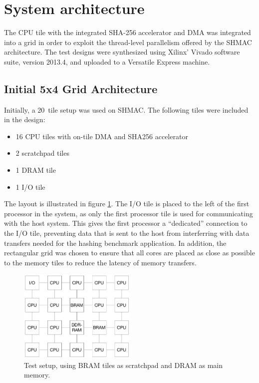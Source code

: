 \section{System architecture}
\label{sec:SHMAC_sys_arch}

The CPU tile with the integrated SHA-256 accelerator and DMA was integrated into a grid in order
to exploit the thread-level parallelism offered by the SHMAC architecture.
The test designs were synthesized using Xilinx' Vivado software suite, version 2013.4, and
uploaded to a Versatile Express machine.

\subsection{Initial 5x4 Grid Architecture}
Initially, a 20~tile setup was used on SHMAC. The following tiles were included in the design:

\begin{itemize}
    \item 16 CPU tiles with on-tile DMA and SHA256 accelerator
    \item 2 scratchpad tiles
    \item 1 DRAM tile
    \item 1 I/O tile
\end{itemize}

The layout is illustrated in figure \ref{fig:5x4}. The I/O tile is placed to the
left of the first processor in the system, as only the first processor tile is used
for communicating with the host system. This gives the first processor a ``dedicated''
connection to the I/O tile, preventing data that is sent to the host from interferring
with data transfers needed for the hashing benchmark application. In addition, the
rectangular grid was chosen to ensure that all cores are placed as close as possible
to the memory tiles to reduce the latency of memory transfers.

\begin{figure}[htb]
    \centering
    \includegraphics[width=0.5\textwidth]{Figures/Measurements/5x4}
    \caption{Test setup, using BRAM tiles as scratchpad and DRAM as main memory.}
    \label{fig:5x4}
\end{figure}

